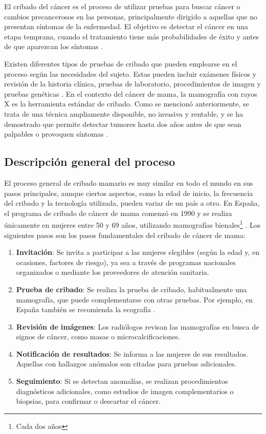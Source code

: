 \documentclass[a4paper,10pt]{book}
\begin{document}
El cribado del cáncer es el proceso de utilizar pruebas para buscar cáncer o cambios precancerosos en las personas, principalmente dirigido a aquellas que no presentan síntomas de la enfermedad. El objetivo es detectar el cáncer en una etapa temprana, cuando el tratamiento tiene más probabilidades de éxito y antes de que aparezcan los síntomas \cite{noauthor_cancer_2010}.

Existen diferentes tipos de pruebas de cribado que pueden emplearse en el proceso según las necesidades del sujeto. Estas pueden incluir exámenes físicos y revisión de la historia clínica, pruebas de laboratorio, procedimientos de imagen y pruebas genéticas \cite{noauthor_cancer_2010}. En el contexto del cáncer de mama, la mamografía con rayos X es la herramienta estándar de cribado. Como se mencionó anteriormente, se trata de una técnica ampliamente disponible, no invasiva y rentable, y se ha demostrado que permite detectar tumores hasta dos años antes de que sean palpables o provoquen síntomas \cite{cancer_que_2023}.

\subsection{Descripción general del proceso}

El proceso general de cribado mamario es muy similar en todo el mundo en sus pasos principales, aunque ciertos aspectos, como la edad de inicio, la frecuencia del cribado y la tecnología utilizada, pueden variar de un país a otro. En España, el programa de cribado de cáncer de mama comenzó en 1990 y se realiza únicamente en mujeres entre 50 y 69 años, utilizando mamografías bienales\footnote{Cada dos años} \cite{noauthor_ministerio_nodate}. Los siguientes pasos son los pasos fundamentales del cribado de cáncer de mama:

\begin{enumerate}
    \item \textbf{Invitación}: Se invita a participar a las mujeres elegibles (según la edad y, en ocasiones, factores de riesgo), ya sea a través de programas nacionales organizados o mediante los proveedores de atención sanitaria.
    \item \textbf{Prueba de cribado}: Se realiza la prueba de cribado, habitualmente una mamografía, que puede complementarse con otras pruebas. Por ejemplo, en España también se recomienda la ecografía \cite{noauthor_map_nodate}.
    \item \textbf{Revisión de imágenes}: Los radiólogos revisan las mamografías en busca de signos de cáncer, como masas o microcalcificaciones.
    \item \textbf{Notificación de resultados}: Se informa a las mujeres de sus resultados. Aquellas con hallazgos anómalos son citadas para pruebas adicionales.
    \item \textbf{Seguimiento}: Si se detectan anomalías, se realizan procedimientos diagnósticos adicionales, como estudios de imagen complementarios o biopsias, para confirmar o descartar el cáncer.
\end{enumerate}
\end{document}
